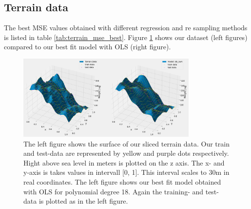  







\subsection{Terrain data}

The best MSE values obtained with different regression and re sampling methods
is listed in table \ref{tab:terrain_mse_best}. Figure \ref{fig:terrain_model}
shows our dataset (left figures) compared to our best fit model with OLS (right
figure). 

\begin{figure}[H]
    \centering
    \includegraphics[width=0.8\textwidth]{Figures/terrain_data_and_model_ols_best.png}
    \caption{The left figure shows the surface of our sliced terrain data. Our
    train and test-data are represented by yellow and purple dots respectively.
Hight above sea level in meters is plotted on the z axis. The x- and y-axis is
takes values in intervall [0, 1]. This interval scales to 30m in real
coordinates. The left figure shows our best fit model obtained with OLS for
polynomial degree 18. Again the training- and test-data is plotted as in the
left figure.}  
    \label{fig:terrain_model} 
\end{figure}

